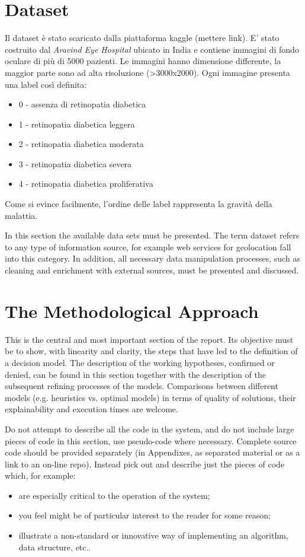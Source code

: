 \section{Dataset}
Il dataset è stato scaricato dalla piattaforma kaggle (mettere link).
E' stato costruito dal \textit{Aravind Eye Hospital} ubicato in India e contiene immagini di fondo oculare di più di 5000 pazienti.
Le immagini hanno dimensione differente, la maggior parte sono ad alta risoluzione (>3000x2000). Ogni immagine presenta una label così definita:
\begin{itemize}
\item 0 - assenza di retinopatia diabetica
\item 1 - retinopatia diabetica leggera
\item 2 - retinopatia diabetica moderata
\item 3 - retinopatia diabetica severa
\item 4 - retinopatia diabetica proliferativa
\end{itemize}
Come si evince facilmente, l'ordine delle label rappresenta la gravità della malattia.

In this section the available data sets must be presented. The term dataset refers to any type of information source, for example web services for geolocation fall into this category. 
In addition, all necessary data manipulation processes, such as cleaning and enrichment with external sources, must be presented and discussed.

\section{The Methodological Approach}

This is the central and most important section of the report. Its objective must be to show, with linearity and clarity, the steps that have led to the definition of a decision model. The description of the working hypotheses, confirmed or denied, can be found in this section together with the description of the subsequent refining processes of the models. Comparisons between different models (e.g. heuristics vs. optimal models) in terms of quality of solutions, their explainability and execution times are welcome. 

Do not attempt to describe all the code in the system, and do not include large pieces of code in this section, use pseudo-code where necessary. Complete source code should be provided separately (in Appendixes, as separated material or as a link to an on-line repo). Instead pick out and describe just the pieces of code which, for example:
\begin{itemize}
\item are especially critical to the operation of the system;
\item you feel might be of particular interest to the reader for some reason;
\item  illustrate a non-standard or innovative way of implementing an algorithm, data
structure, etc..
\end{itemize}

